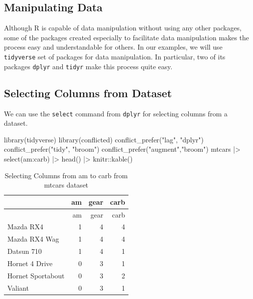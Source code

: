 \documentclass[
  letterpaper,
  paper =a4,
  twoside,
  openright,
  headsepline,
  footsepline,
  listof = totocnumbered,
  chapterprefix = true,
  firstiscover,
  parskip = full*]{scrbook}
\newenvironment{Shaded}{\begin{snugshade}}{\end{snugshade}}
\newcommand{\FunctionTok}[1]{\textcolor[rgb]{0.28,0.35,0.67}{#1}}
\newcommand{\NormalTok}[1]{\textcolor[rgb]{0.00,0.23,0.31}{#1}}
\newcommand{\SpecialCharTok}[1]{\textcolor[rgb]{0.37,0.37,0.37}{#1}}
\newcommand{\StringTok}[1]{\textcolor[rgb]{0.13,0.47,0.30}{#1}}
\begin{document}
\subsection{Manipulating Data}\label{manipulating-data}

Although R is capable of data manipulation without using any other
packages, some of the packages created especially to facilitate data
manipulation makes the process easy and understandable for others. In
our examples, we will use \texttt{tidyverse} set of packages for data
manipulation. In particular, two of its packages \texttt{dplyr} and
\texttt{tidyr} make this process quite easy.

\subsection{Selecting Columns from
Dataset}\label{selecting-columns-from-dataset}

We can use the \texttt{select} command from \texttt{dplyr} for selecting
columns from a dataset.

\begin{Shaded}
\begin{Highlighting}[]
\FunctionTok{library}\NormalTok{(tidyverse)}
\FunctionTok{library}\NormalTok{(conflicted)}
\FunctionTok{conflict\_prefer}\NormalTok{(}\StringTok{"lag"}\NormalTok{, }\StringTok{"dplyr"}\NormalTok{)}
\FunctionTok{conflict\_prefer}\NormalTok{(}\StringTok{"tidy"}\NormalTok{, }\StringTok{"broom"}\NormalTok{)}
\FunctionTok{conflict\_prefer}\NormalTok{(}\StringTok{"augment"}\NormalTok{,}\StringTok{"broom"}\NormalTok{)}
\NormalTok{mtcars }\SpecialCharTok{|\textgreater{}} \FunctionTok{select}\NormalTok{(am}\SpecialCharTok{:}\NormalTok{carb) }\SpecialCharTok{|\textgreater{}} \FunctionTok{head}\NormalTok{() }\SpecialCharTok{|\textgreater{}}\NormalTok{ knitr}\SpecialCharTok{::}\FunctionTok{kable}\NormalTok{()}
\end{Highlighting}
\end{Shaded}

\begin{longtable}[]{@{}lrrr@{}}
\caption{Selecting Columns from am to carb from mtcars
dataset}\tabularnewline
\toprule\noalign{}
& am & gear & carb \\
\midrule\noalign{}
\endfirsthead
\toprule\noalign{}
& am & gear & carb \\
\midrule\noalign{}
\endhead
\bottomrule\noalign{}
\endlastfoot
Mazda RX4 & 1 & 4 & 4 \\
Mazda RX4 Wag & 1 & 4 & 4 \\
Datsun 710 & 1 & 4 & 1 \\
Hornet 4 Drive & 0 & 3 & 1 \\
Hornet Sportabout & 0 & 3 & 2 \\
Valiant & 0 & 3 & 1 \\
\end{longtable}
\end{document}

